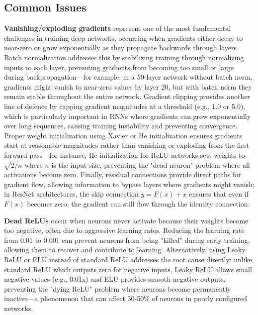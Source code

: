 \subsection{Common Issues}

\textbf{Vanishing/exploding gradients} represent one of the most fundamental challenges in training deep networks, occurring when gradients either decay to near-zero or grow exponentially as they propagate backwards through layers. Batch normalization addresses this by stabilizing training through normalizing inputs to each layer, preventing gradients from becoming too small or large during backpropagation—for example, in a 50-layer network without batch norm, gradients might vanish to near-zero values by layer 20, but with batch norm they remain stable throughout the entire network. Gradient clipping provides another line of defence by capping gradient magnitudes at a threshold (e.g., 1.0 or 5.0), which is particularly important in RNNs where gradients can grow exponentially over long sequences, causing training instability and preventing convergence. Proper weight initialization using Xavier or He initialization ensures gradients start at reasonable magnitudes rather than vanishing or exploding from the first forward pass—for instance, He initialization for ReLU networks sets weights to $\sqrt{2/n}$ where $n$ is the input size, preventing the "dead neuron" problem where all activations become zero. Finally, residual connections provide direct paths for gradient flow, allowing information to bypass layers where gradients might vanish; in ResNet architectures, the skip connection $y = F(x) + x$ ensures that even if $F(x)$ becomes zero, the gradient can still flow through the identity connection.


\textbf{Dead ReLUs} occur when neurons never activate because their weights become too negative, often due to aggressive learning rates. Reducing the learning rate from 0.01 to 0.001 can prevent neurons from being "killed" during early training, allowing them to recover and contribute to learning. Alternatively, using Leaky ReLU or ELU instead of standard ReLU addresses the root cause directly: unlike standard ReLU which outputs zero for negative inputs, Leaky ReLU allows small negative values (e.g., 0.01x) and ELU provides smooth negative outputs, preventing the "dying ReLU" problem where neurons become permanently inactive—a phenomenon that can affect 30-50\% of neurons in poorly configured networks.


